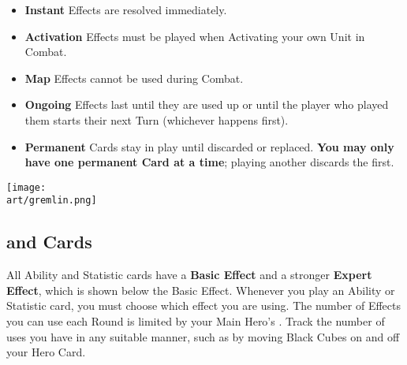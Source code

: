 \begin{multicols*}{2}
\begin{enumerate}
  \begin{itemize}
    \item \textbf{Instant}  Effects are resolved immediately.
    \item \textbf{Activation}  Effects must be played when Activating your own Unit in Combat.
    \item \textbf{Map}  Effects cannot be used during Combat.
    \item \textbf{Ongoing}  Effects last until they are used up or until the player who played them starts their next Turn (whichever happens first).
    \item \textbf{Permanent}  Cards stay in play until discarded or replaced.
      \textbf{You may only have one permanent Card at a time}; playing another discards the first.
  \end{itemize}
\end{enumerate}

\vfill
\hfill\texttt{[image: \\art/gremlin.png]}

\clearpage

\subsection*{ and  Cards}

All Ability and Statistic cards have a \textbf{Basic Effect} and a stronger \textbf{Expert}  \textbf{Effect}, which is shown below the Basic Effect.
Whenever you play an Ability or Statistic card, you must choose which effect you are using.
The number of  Effects you can use each Round is limited by your Main Hero's .
Track the number of uses you have in any suitable manner, such as by moving Black Cubes on and off your Hero Card.\par
\bigskip


\end{multicols*}
